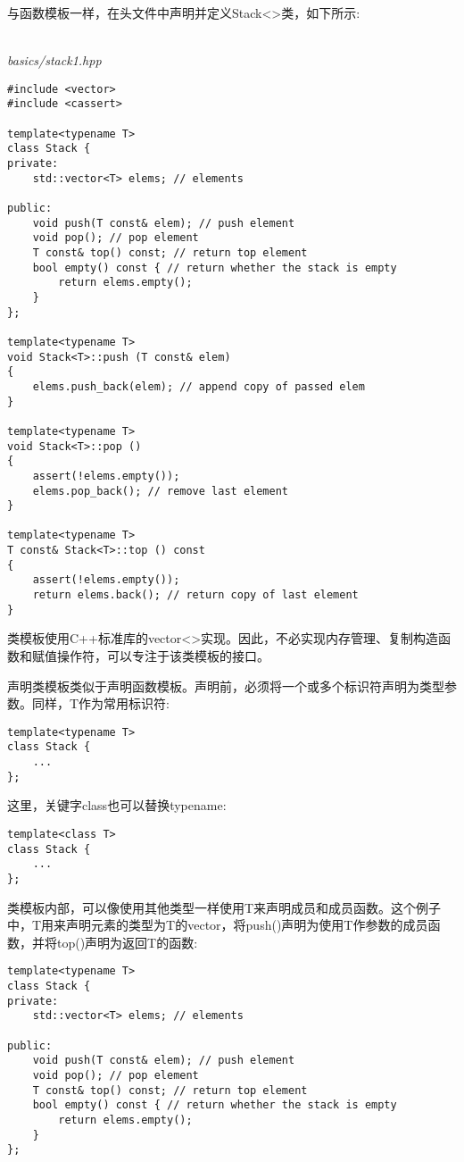 
与函数模板一样，在头文件中声明并定义Stack<>类，如下所示:

\hspace*{\fill} \\ %
\noindent
\textit{basics/stack1.hpp}
\begin{lstlisting}[style=styleCXX]
#include <vector>
#include <cassert>

template<typename T>
class Stack {
private:
	std::vector<T> elems; // elements
	
public:
	void push(T const& elem); // push element
	void pop(); // pop element
	T const& top() const; // return top element
	bool empty() const { // return whether the stack is empty
		return elems.empty();
	}
};

template<typename T>
void Stack<T>::push (T const& elem)
{
	elems.push_back(elem); // append copy of passed elem
}

template<typename T>
void Stack<T>::pop ()
{
	assert(!elems.empty());
	elems.pop_back(); // remove last element
}

template<typename T>
T const& Stack<T>::top () const
{
	assert(!elems.empty());
	return elems.back(); // return copy of last element
}
\end{lstlisting}

类模板使用C++标准库的vector<>实现。因此，不必实现内存管理、复制构造函数和赋值操作符，可以专注于该类模板的接口。


声明类模板类似于声明函数模板。声明前，必须将一个或多个标识符声明为类型参数。同样，T作为常用标识符:

\begin{lstlisting}[style=styleCXX]
template<typename T>
class Stack {
	...
};
\end{lstlisting}

这里，关键字class也可以替换typename:

\begin{lstlisting}[style=styleCXX]
template<class T>
class Stack {
	...
};
\end{lstlisting}

类模板内部，可以像使用其他类型一样使用T来声明成员和成员函数。这个例子中，T用来声明元素的类型为T的vector，将push()声明为使用T作参数的成员函数，并将top()声明为返回T的函数:

\begin{lstlisting}[style=styleCXX]
template<typename T>
class Stack {
private:
	std::vector<T> elems; // elements
	
public:
	void push(T const& elem); // push element
	void pop(); // pop element
	T const& top() const; // return top element
	bool empty() const { // return whether the stack is empty
		return elems.empty();
	}
};
\end{lstlisting}

